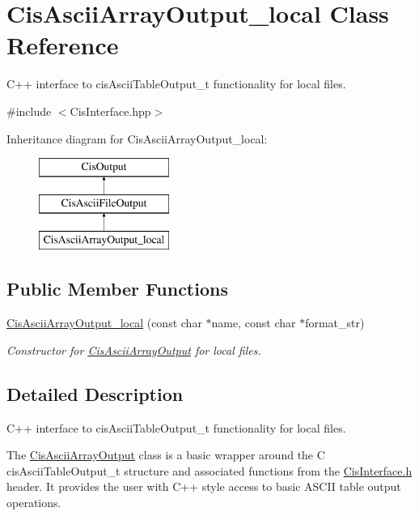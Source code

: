 \hypertarget{classCisAsciiArrayOutput__local}{}\section{Cis\+Ascii\+Array\+Output\+\_\+local Class Reference}
\label{classCisAsciiArrayOutput__local}


C++ interface to cis\+Ascii\+Table\+Output\+\_\+t functionality for local files.  




{\ttfamily \#include $<$Cis\+Interface.\+hpp$>$}

Inheritance diagram for Cis\+Ascii\+Array\+Output\+\_\+local\+:\begin{figure}[H]
\begin{center}
\leavevmode
\includegraphics[height=3.000000cm]{classCisAsciiArrayOutput__local}
\end{center}
\end{figure}
\subsection*{Public Member Functions}
\begin{DoxyCompactItemize}
\item 
\mbox{\hyperlink{classCisAsciiArrayOutput__local_a65fa28278be3cf10be0e1a4882f2327f}{Cis\+Ascii\+Array\+Output\+\_\+local}} (const char $\ast$name, const char $\ast$format\+\_\+str)
\begin{DoxyCompactList}\small\item\em Constructor for \mbox{\hyperlink{classCisAsciiArrayOutput}{Cis\+Ascii\+Array\+Output}} for local files. \end{DoxyCompactList}\end{DoxyCompactItemize}


\subsection{Detailed Description}
C++ interface to cis\+Ascii\+Table\+Output\+\_\+t functionality for local files. 

The \mbox{\hyperlink{classCisAsciiArrayOutput}{Cis\+Ascii\+Array\+Output}} class is a basic wrapper around the C cis\+Ascii\+Table\+Output\+\_\+t structure and associated functions from the \mbox{\hyperlink{CisInterface_8h_source}{Cis\+Interface.\+h}} header. It provides the user with C++ style access to basic A\+S\+C\+II table output operations. 

